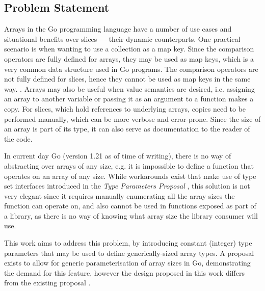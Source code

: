 

\subsection{Problem Statement}

Arrays in the Go programming language have a number of use cases and situational
benefits over slices --- their dynamic counterparts. One practical scenario is
when wanting to use a collection as a map key. Since the comparison operators
are fully defined for arrays, they may be used as map keys, which is a very
common data structure used in Go programs. The comparison operators are not
fully defined for slices, hence they cannot be used as map keys in the same way.
\autocite{spec}. Arrays may also be useful when value semantics are desired,
i.e. assigning an array to another variable or passing it as an argument to a
function makes a copy. For slices, which hold references to underlying arrays,
copies need to be performed manually, which can be more verbose and error-prone.
Since the size of an array is part of its type, it can also serve as
documentation to the reader of the code.

In current day Go (version 1.21 as of time of writing), there is no way of
abstracting over arrays of any size, e.g. it is impossible to define a function
that operates on an array of any size. While workarounds exist that make use of
type set interfaces introduced in the \emph{Type Parameters Proposal}
\autocite{genericsProposal}, this solution is not very elegant since it requires
manually enumerating all the array sizes the function can operate on, and also
cannot be used in functions exposed as part of a library, as there is no way of
knowing what array size the library consumer will use.

This work aims to address this problem, by introducing constant (integer) type
parameters that may be used to define generically-sized array types. A proposal
exists to allow for generic parameterisation of array sizes in Go, demonstrating
the demand for this feature, however the design proposed in this work differs
from the existing proposal \autocite{goArrayProposal}.



